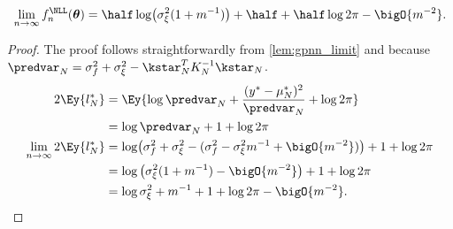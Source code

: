 \begin{corollary}
\label{cor:nll_limit}
    \[
        \lim_{n\rightarrow\infty}f_n^{\NLL}(\bm{\theta}) = \half\log(\sigma_\xi^2(1+m^{-1})) +\half + \half\log2\pi - \bigO{m^{-2}}.
    \]
\end{corollary}
\begin{proof}\label{proof:nll_limit}
    The proof follows straightforwardly from \autoref{lem:gpnn_limit} and because \(\predvar_N = \sigma_f^2 + \sigma_\xi^2 - \kstar_N^TK_N^{-1}\kstar_N\).
    \begin{align*}
        2\Ey{l^*_N} &= \Ey{\log\predvar_N + \frac{(y^*-\mu_N^*)^2}{\predvar_N} + \log2\pi } \\
        &= \log\predvar_N + 1 + \log2\pi \\
        \lim_{n\rightarrow\infty}2\Ey{l^*_N} &= \log(\sigma_f^2 + \sigma_\xi^2 -(\sigma_f^2 - \sigma_\xi^2 m^{-1} + \bigO{m^{-2}})) + 1 + \log2\pi \\
        &= \log\left(\sigma_\xi^2(1+m^{-1}) - \bigO{m^{-2}}\right) +1 + \log2\pi \\
        &= \log\sigma_\xi^2 + m^{-1} + 1 + \log2\pi - \bigO{m^{-2}}.
    \end{align*}
\end{proof}

